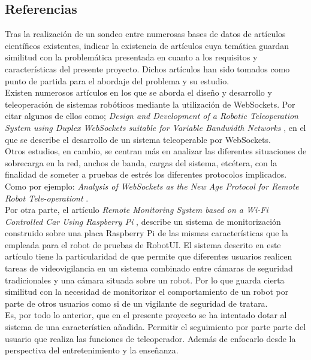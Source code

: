 \subsection{ Referencias }
\label{sec:referencias}

Tras la realización de un sondeo entre numerosas bases de datos de artículos científicos existentes, indicar la existencia de artículos cuya temática guardan similitud con la problemática presentada
en cuanto a los requisitos y características del presente proyecto. Dichos artículos han sido tomados como punto de partida para el abordaje del problema y su estudio.\\

Existen numerosos artículos en los que se aborda el diseño y desarrollo y teleoperación de sistemas robóticos mediante la utilización de WebSockets. Por citar algunos de ellos como; \emph{Design and Development of a Robotic Teleoperation System using
Duplex WebSockets suitable for Variable Bandwidth Networks} \cite{article:1}, en el que se describe el desarrollo de un sistema teleoperable por WebSockets.\\
  
Otros estudios, en cambio, se centran más en analizar las diferentes situaciones de sobrecarga en la red, anchos de banda, cargas del sistema, etcétera, con la finalidad de someter a pruebas de estrés
los diferentes protocolos implicados. Como por ejemplo: \emph{Analysis of WebSockets as the New Age Protocol for Remote Robot Tele-operationt} \cite{article:2}.\\
  
Por otra parte, el artículo \emph{ Remote Monitoring System based on a Wi-Fi Controlled Car Using Raspberry Pi } \cite{article:3}, describe un sistema de monitorización construido sobre una placa 
Raspberry Pi de las mismas características que la empleada para el robot de pruebas de RobotUI. El sistema descrito en este artículo tiene la particularidad de que permite que diferentes usuarios realicen tareas de videovigilancia en un sistema combinado entre cámaras de seguridad tradicionales y una cámara situada sobre un robot.
Por lo que guarda cierta similitud con la necesidad de monitorizar el comportamiento de un robot por parte de otros usuarios como si de un vigilante de seguridad de tratara.\\ 
  
  
Es, por todo lo anterior, que en el presente proyecto se ha intentado dotar al sistema de una característica añadida. Permitir el seguimiento por parte parte del usuario que realiza las funciones de teleoperador. Además de enfocarlo
desde la perspectiva del entretenimiento y la enseñanza.\\


